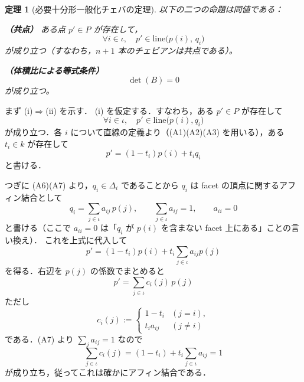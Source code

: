 \documentclass[a4paper,12pt]{bxjsbook}
\makeatletter
\newlength{\customindent}
\theoremstyle{theorem}
\newtheorem{theorem}{定理}[chapter]
\renewenvironment{proof}[1][\proofname]{%
  \par\pushQED{\qed}%
  \normalfont
  \topsep6\p@\@plus6\p@\relax
  \list{}{%
    \leftmargin=\customindent
    \rightmargin=0pt
    \labelwidth=0pt
    \labelsep=0pt
    \itemindent=0pt
    \listparindent=0pt
    \parsep=0pt
  }%
  \item[\itshape #1\@addpunct{.}\hspace{0.5em}]%
  \setlength{\displayindent}{\customindent}%
  \setlength{\displaywidth}{\dimexpr\linewidth-\customindent\relax}%
  \ignorespaces
}{%
  \popQED\endlist\@endpefalse
}
\makeatother
\begin{document}
\begin{theorem}[必要十分形一般化チェバの定理]
        以下の二つの命題は同値である：
        \begin{theoremenumerate}[label=(\roman*), leftmargin=4em, topsep=2pt, partopsep=0pt, itemsep=0pt, parsep=0pt]
            \item \textbf{（共点）} ある点 $p'\in P$ が存在して，
            \[
                \forall i\in\iota,\quad p'\in \mathrm{line}\bigl(p(i),\,q_i\bigr)
            \]
            が成り立つ（すなわち，$n+1$ 本のチェビアンは共点である）。
            \item \textbf{（体積比による等式条件）}
            \[
                \det(B)=0
            \]
            が成り立つ。
        \end{theoremenumerate}
    \end{theorem}

    \begin{proof}
        まず (i)$\Rightarrow$(ii) を示す．
        (i) を仮定する．すなわち，ある $p'\in P$ が存在して
        \[
          \forall i\in\iota,\quad p' \in \mathrm{line}\bigl(p(i),q_i\bigr)
        \]
        が成り立つ．各 $i$ について直線の定義より（(A1)(A2)(A3) を用いる），ある $t_i\in k$ が存在して
        \[
          p'=(1-t_i)p(i)+t_i q_i
        \]
        と書ける．
        
        つぎに (A6)(A7) より，$q_i\in\Delta_i$ であることから $q_i$ は facet の頂点に関するアフィン結合として
        \[
          q_i=\sum_{j\in\iota} a_{ij}\,p(j),\qquad \sum_{j\in\iota}a_{ij}=1,\qquad a_{ii}=0
        \]
        と書ける（ここで $a_{ii}=0$ は「$q_i$ が $p(i)$ を含まない facet 上にある」ことの言い換え）．
        これを上式に代入して
        \[
          p'=(1-t_i)p(i)+t_i\sum_{j\in\iota}a_{ij}p(j)
        \]
        を得る．右辺を $p(j)$ の係数でまとめると
        \[
          p'=\sum_{j\in\iota} c_i(j)\,p(j)
        \]
        ただし
        \[
          c_i(j):=
          \begin{cases}
            1-t_i & (j=i),\\
            t_i a_{ij} & (j\neq i)
          \end{cases}
        \]
        である．(A7) より $\sum_j a_{ij}=1$ なので
        \[
          \sum_{j\in\iota}c_i(j)=(1-t_i)+t_i\sum_{j\in\iota}a_{ij}=1
        \]
        が成り立ち，従ってこれは確かにアフィン結合である．
        

\end{proof}
\end{document}

